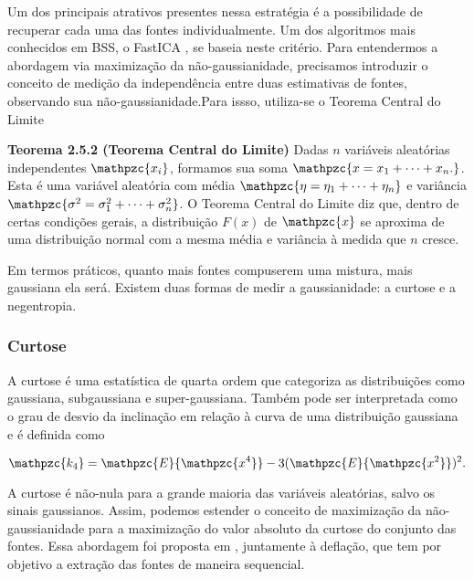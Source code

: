     Um dos principais atrativos presentes nessa estratégia é a possibilidade de recuperar cada uma das fontes individualmente. Um dos algoritmos mais conhecidos em BSS, o FastICA \cite{fastica1}, se baseia neste critério. Para entendermos a abordagem via maximização da não-gaussianidade, precisamos introduzir o conceito de medição da independência entre duas estimativas de fontes, observando sua não-gaussianidade.Para issso, utiliza-se o Teorema Central do Limite \cite{cetrallimit}
    
    \medskip
    
    \textbf{Teorema 2.5.2 (Teorema Central do Limite)} Dadas ${n}$ variáveis aleatórias independentes $\mathpzc{x_i}$, formamos sua soma $\mathpzc{x = x_1 + \dots + x_n.}$. Esta é uma variável aleatória com média $\mathpzc{\eta = \eta_1 + \dots + \eta_n}$ e variância $\mathpzc{\sigma^2 = \sigma_1^2 + \dots + \sigma_n^2}$. O Teorema Central do Limite diz que, dentro de certas condições gerais, a distribuição ${F(x)}$ de $\mathpzc{x}$  se aproxima de uma distribuição normal com a mesma média e variância à medida que ${n}$ cresce.
    
    \medskip
    
    Em termos práticos, quanto mais fontes compuserem uma mistura, mais gaussiana ela será. Existem duas formas de medir a gaussianidade: a curtose e a negentropia.

\subsubsection{Curtose}
    
    A curtose é uma estatística de quarta ordem que categoriza as distribuições como gaussiana, subgaussiana e super-gaussiana. Também pode ser interpretada como o grau de desvio da inclinação em relação à curva de uma distribuição gaussiana e é definida como
    
    \begin{equation}
        \mathpzc{k_4} = \mathpzc{E}\{\mathpzc{x^4}\} - 3(\mathpzc{E}\{\mathpzc{x^2}\})^2.
    \end{equation} 
    
    A curtose é não-nula para a grande maioria das variáveis aleatórias, salvo os sinais gaussianos. Assim, podemos estender o conceito de maximização da não-gaussianidade para a maximização do valor absoluto da curtose do conjunto das fontes. Essa abordagem foi proposta em \cite{ML}, juntamente à deflação, que tem por objetivo a extração das fontes de maneira sequencial.
    
